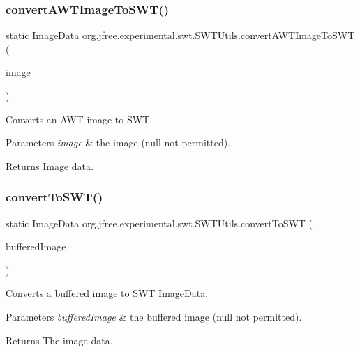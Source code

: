 \subsubsection{\texorpdfstring{convert\+A\+W\+T\+Image\+To\+S\+W\+T()}{convertAWTImageToSWT()}}
{\footnotesize\ttfamily static Image\+Data org.\+jfree.\+experimental.\+swt.\+S\+W\+T\+Utils.\+convert\+A\+W\+T\+Image\+To\+S\+WT (\begin{DoxyParamCaption}\item[{Image}]{image }\end{DoxyParamCaption})\hspace{0.3cm}{\ttfamily [static]}}

Converts an A\+WT image to S\+WT.


\begin{DoxyParams}{Parameters}
{\em image} & the image ({\ttfamily null} not permitted).\\
\hline
\end{DoxyParams}
\begin{DoxyReturn}{Returns}
Image data. 
\end{DoxyReturn}
\mbox{\label{classorg_1_1jfree_1_1experimental_1_1swt_1_1_s_w_t_utils_afd4c7078d47c41b35b3a4adcd98a73fe}} 
\subsubsection{\texorpdfstring{convert\+To\+S\+W\+T()}{convertToSWT()}}
{\footnotesize\ttfamily static Image\+Data org.\+jfree.\+experimental.\+swt.\+S\+W\+T\+Utils.\+convert\+To\+S\+WT (\begin{DoxyParamCaption}\item[{Buffered\+Image}]{buffered\+Image }\end{DoxyParamCaption})\hspace{0.3cm}{\ttfamily [static]}}

Converts a buffered image to S\+WT {\ttfamily Image\+Data}.


\begin{DoxyParams}{Parameters}
{\em buffered\+Image} & the buffered image ({\ttfamily null} not permitted).\\
\hline
\end{DoxyParams}
\begin{DoxyReturn}{Returns}
The image data. 
\end{DoxyReturn}
\mbox{\label{classorg_1_1jfree_1_1experimental_1_1swt_1_1_s_w_t_utils_aa5ae219eb60234a9f9259cabc5264de5}} 
